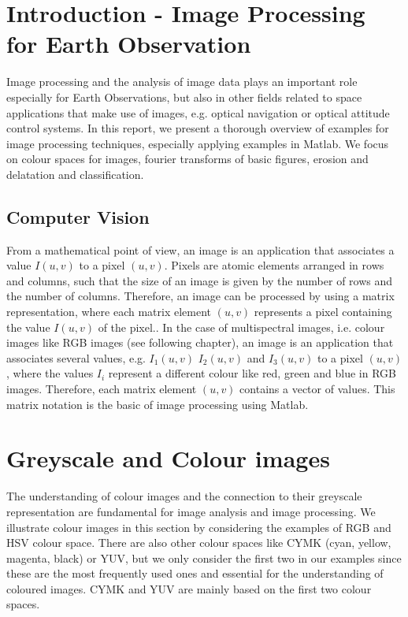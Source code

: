 \section{Introduction - Image Processing for Earth Observation}
Image processing and the analysis of image data plays an important role especially for Earth Observations, but also in other fields related to space applications that make use of images, e.g. optical navigation or optical attitude control systems. In this report, we present a thorough overview of examples for image processing techniques, especially applying examples in Matlab. We focus on colour spaces for images, fourier transforms of basic figures, erosion and delatation and classification. 

\subsection{Computer Vision}
From a mathematical point of view, an image is an application that associates a value $I(u,v)$ to a pixel $(u,v)$. Pixels are atomic elements arranged in rows and columns,  such that the size of an image is given by the number of rows and the number of columns. Therefore, an image can be processed by using a matrix representation, where each matrix element $(u,v)$  represents a pixel containing the value $I(u,v)$ of the pixel.. In the case of multispectral images, i.e. colour images like RGB images (see following chapter), an image is an application that associates several values, e.g. $I_{1}(u,v)$ $I_{2}(u,v)$ and $I_{3}(u,v)$ to a pixel $(u,v)$, where the values $I_{i}$ represent a different colour like red, green and blue in RGB images. Therefore, each matrix element $(u,v)$ contains a vector of values. This matrix notation is the basic of image processing using Matlab.

\section{Greyscale and Colour images}
The understanding of colour images and the connection to their greyscale representation are fundamental for image analysis and image processing. We illustrate colour images in this section by  considering the examples of RGB and HSV colour space. There are also other colour spaces like CYMK (cyan, yellow, magenta, black) or YUV, but we only consider the first two in our examples since these are the most frequently used ones and essential for the understanding of coloured images. CYMK and YUV are mainly based on the first two colour spaces.

